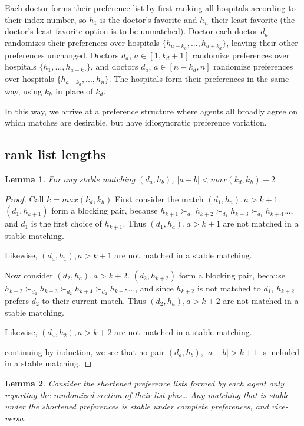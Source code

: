 \documentclass[WP]{AEA}
\newtheorem{lemma}{Lemma}
\begin{document}
Each doctor forms their preference list by first ranking all hospitals according to their index number, so $h_1$ is the doctor's favorite and $h_n$ their least favorite (the doctor's least favorite option is to be unmatched).  
Doctor each doctor $d_a$ randomizes their preferences over hospitals $\{h_{a-k_d},...,h_{a+k_d}\}$, leaving their other preferences unchanged.  Doctors $d_a$, $a \in [1,k_d+1]$ randomize preferences over hospitals  $\{h_{1},...,h_{a+k_d}\}$, and doctors $d_a$, $a \in [n-k_d,n]$ randomize preferences over hospitals  $\{h_{a-k_d},...,h_{n}\}$.  
The hospitals form their preferences in the same way, using $k_h$ in place of $k_d$.

In this way, we arrive at a preference structure where agents all broadly agree on which matches are desirable, but have idiosyncratic preference variation.

\subsection{rank list lengths}
\begin{lemma}
	For any stable matching $(d_a,h_b)$, $|a-b| < max(k_d,k_h)+2$
\end{lemma}
\begin{proof}
	Call $k = max(k_d,k_h)$
	First consider the match $(d_1,h_a), a > k+1$.  $(d_1,h_{k+1})$ form a blocking pair, because $h_{k+1} \succ_{d_1} h_{k+2} \succ_{d_1} h_{k+3} \succ_{d_1} h_{k+4}...$, and $d_1$ is the first choice of $h_{k+1}$.  Thus $(d_1,h_a), a > k+1$ are not matched in a stable matching.
	
	Likewise, $(d_a,h_1), a > k+1$ are not matched in a stable matching.

	Now consider $(d_2,h_a), a > k+2$.  $(d_2,h_{k+2})$ form a blocking pair, because $h_{k+2} \succ_{d_2} h_{k+3} \succ_{d_2} h_{k+4} \succ_{d_2} h_{k+5}...$, and since $h_{k+2}$ is not matched to $d_1$,  $h_{k+2}$ prefers $d_2$ to their current match.  Thus $(d_2,h_a), a > k+2$ are not matched in a stable matching.

	Likewise, $(d_a,h_2), a > k+2$ are not matched in a stable matching.

	continuing by induction, we see that no pair $(d_a,h_b)$, $|a-b| > k+1$ is included in a stable matching.

	

\end{proof}


\begin{lemma}
	Consider the shortened preference lists formed by each agent only reporting the randomized section of their list plus\dots
	Any matching that is stable under the shortened preferences is stable under complete preferences, and vice-versa.
\end{lemma}
\end{document}
